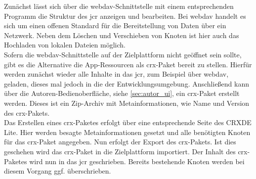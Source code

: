 Zunächst lässt sich über die \ac{webdav}-Schnittstelle mit einem entsprechenden Programm die Struktur des \ac{jcr} anzeigen und bearbeiten. Bei \acf{webdav} handelt es sich um einen offenen Standard für die Bereitstellung von Daten über ein Netzwerk. Neben dem Löschen und Verschieben von Knoten ist hier auch das Hochladen von lokalen Dateien möglich. \\
Sofern die \ac{webdav}-Schnittstelle auf der Zielplattform nicht geöffnet sein sollte, gibt es die Alternative die App-Ressourcen als \ac{crx}-Paket bereit zu stellen. Hierfür werden zunächst wieder alle Inhalte in das \ac{jcr}, zum Beispiel über \ac{webdav}, geladen, dieses mal jedoch in die der Entwicklungsumgebung. Anschließend kann über die Autoren-Bedienoberfläche, siehe \autoref{sec:autor_ui}, ein \ac{crx}-Paket erstellt werden. Dieses ist ein Zip-Archiv mit Metainformationen, wie Name und Version des \ac{crx}-Pakets.\\
Das Erstellen eines \ac{crx}-Paketes erfolgt über eine entsprechende Seite des CRXDE Lite. Hier werden besagte Metainformationen gesetzt und alle benötigten Knoten für das \ac{crx}-Paket angegeben. Nun erfolgt der Export des \ac{crx}-Pakets. Ist dies geschehen wird das \ac{crx}-Paket in die Zielplattform importiert. Der Inhalt des \ac{crx}-Paketes wird nun in das \ac{jcr} geschrieben. Bereits bestehende Knoten werden bei diesem Vorgang ggf. überschrieben.